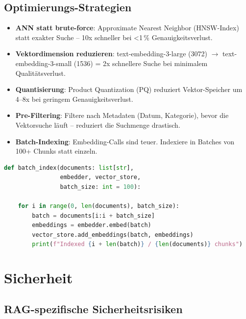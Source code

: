 \subsection{Optimierungs-Strategien}

\begin{itemize}[leftmargin=*]
    \item \textbf{ANN statt brute-force}: Approximate Nearest Neighbor (HNSW-Index) statt exakter Suche -- 10x schneller bei <1\,\% Genauigkeitsverlust.
    \item \textbf{Vektordimension reduzieren}: text-embedding-3-large (3072) $\rightarrow$ text-embedding-3-small (1536) = 2x schnellere Suche bei minimalem Qualitätsverlust.
    \item \textbf{Quantisierung}: Product Quantization (PQ) reduziert Vektor-Speicher um 4--8x bei geringem Genauigkeitsverlust.
    \item \textbf{Pre-Filtering}: Filtere nach Metadaten (Datum, Kategorie), bevor die Vektorsuche läuft -- reduziert die Suchmenge drastisch.
    \item \textbf{Batch-Indexing}: Embedding-Calls sind teuer. Indexiere in Batches von 100+ Chunks statt einzeln.
\end{itemize}

\begin{lstlisting}[language=Python, caption=Batch-Indexing für bessere Performance]
def batch_index(documents: list[str],
                embedder, vector_store,
                batch_size: int = 100):

    for i in range(0, len(documents), batch_size):
        batch = documents[i:i + batch_size]
        embeddings = embedder.embed(batch)
        vector_store.add_embeddings(batch, embeddings)
        print(f"Indexed {i + len(batch)} / {len(documents)} chunks")
\end{lstlisting}

\section{Sicherheit}

\subsection{RAG-spezifische Sicherheitsrisiken}

